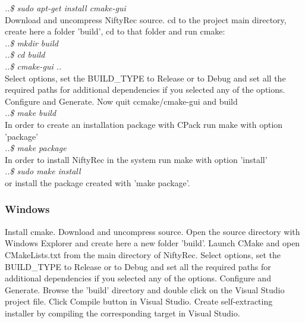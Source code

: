 \documentclass[12pt,a4paper]{report}
\begin{document}
   \emph {..\$ sudo apt-get install cmake-gui}\\

\noindent Download and uncompress NiftyRec source. cd to the 
   project main directory, create here a folder 'build', cd to that folder 
   and run cmake: \\

   \emph {..\$ mkdir build}\\
\indent   \emph {..\$ cd build}\\
\indent   \emph {..\$ cmake-gui ..}\\

\noindent    Select options, set the BUILD\_TYPE to Release or to Debug and set all the required 
   paths for additional dependencies if you selected any of the options. 
   Configure and Generate. Now quit ccmake/cmake-gui and build\\
  
   \emph {..\$ make build}\\

\noindent    In order to create an installation package with CPack run make with option 'package'\\

   \emph {..\$ make package}\\

\noindent    In order to install NiftyRec in the system run make with option 'install'\\

   \emph {..\$ sudo make install}\\

\noindent    or install the package created with 'make package'.

\subsubsection{Windows}
Install cmake. Download and uncompress source. Open the source directory 
with Windows Explorer and create here a new folder 'build'. Launch CMake 
and open CMakeLists.txt from the main directory of NiftyRec.
Select options, set the BUILD\_TYPE to Release or to Debug and set all the required 
paths for additional dependencies if you selected any of the options. 
Configure and Generate. Browse the 'build' directory and double click 
on the Visual Studio project file. Click Compile button in Visual Studio. 
Create self-extracting installer by compiling the corresponding target in Visual 
Studio. 
\end{document}
